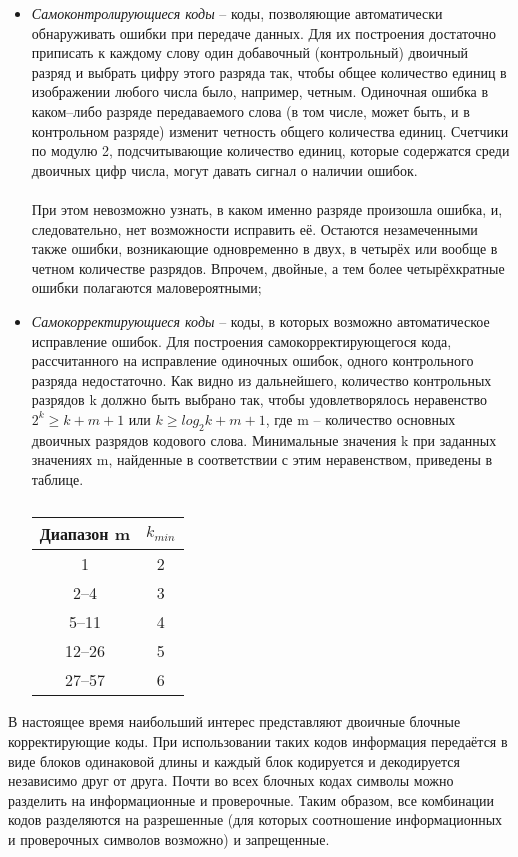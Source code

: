 \begin{itemize}
\item \emph{Самоконтролирующиеся коды} -- коды, позволяющие автоматически обнаруживать ошибки при передаче данных. Для их построения достаточно приписать к каждому слову один добавочный (контрольный) двоичный разряд и выбрать цифру этого разряда так, чтобы общее количество единиц в изображении любого числа было, например, четным. Одиночная ошибка в каком--либо разряде передаваемого слова (в том числе, может быть, и в контрольном разряде) изменит четность общего количества единиц. Счетчики по модулю 2, подсчитывающие количество единиц, которые содержатся среди двоичных цифр числа, могут давать сигнал о наличии ошибок.\\
\\При этом невозможно узнать, в каком именно разряде произошла ошибка, и, следовательно, нет возможности исправить её. Остаются незамеченными также ошибки, возникающие одновременно в двух, в четырёх или вообще в четном количестве разрядов. Впрочем, двойные, а тем более четырёхкратные ошибки полагаются маловероятными;
\item \emph{Самокорректирующиеся коды} -- коды, в которых возможно автоматическое исправление ошибок. Для построения самокорректирующегося кода, рассчитанного на исправление одиночных ошибок, одного контрольного разряда недостаточно. Как видно из дальнейшего, количество контрольных разрядов k должно быть выбрано так, чтобы удовлетворялось неравенство $2^k \ge k+m+1$ или $k \ge log_2{k+m+1}$, где m --  количество основных двоичных разрядов кодового слова. Минимальные значения k при заданных значениях m, найденные в соответствии с этим неравенством, приведены в таблице.

\begin{table}[h]
\caption{}
\begin{center}
\begin{tabular}{|c|c|}
\hline
 Диапазон m & $k_{min}$  \\
\hline
1 & 2 \\
\hline
2--4 & 3\\
\hline
5--11 & 4\\
\hline
12--26 & 5\\
\hline
27--57 & 6 \\
\hline
\end{tabular}
\end{center}
\end{table}
\end{itemize}
В настоящее время наибольший интерес представляют двоичные блочные корректирующие коды. При использовании таких кодов информация передаётся в виде блоков одинаковой длины и каждый блок кодируется и декодируется независимо друг от друга. Почти во всех блочных кодах символы можно разделить на информационные и проверочные. Таким образом, все комбинации кодов разделяются на разрешенные (для которых соотношение информационных и проверочных символов возможно) и запрещенные.\\

